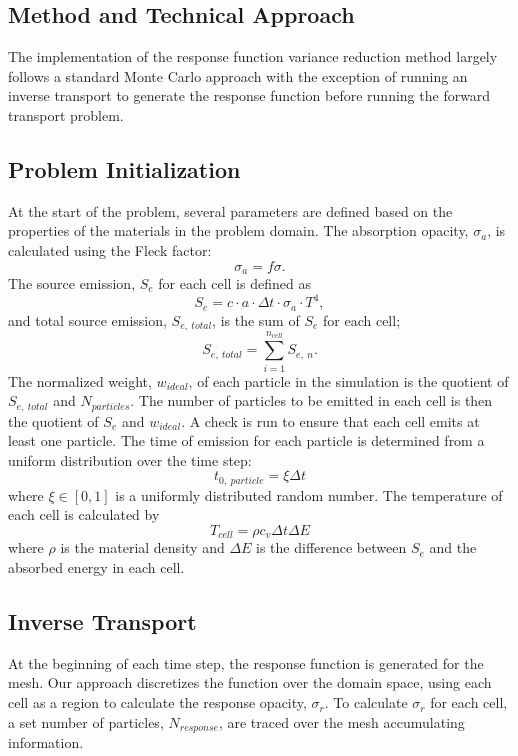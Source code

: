 \begin{chapabstract}
\section{Method and Technical Approach}
The implementation of the response function variance reduction method largely follows a standard Monte Carlo approach with the exception of running an inverse transport to generate the response function before running the forward transport problem. 

\subsection{Problem Initialization}	
At the start of the problem, several parameters are defined based on the properties of the materials in the problem domain. The absorption opacity, $\sigma_{a}$, is calculated using the Fleck factor:
\begin{equation}
\sigma_{a} = f \sigma.
\end{equation}The source emission, $S_{e}$ for each cell is defined as
\begin{equation}
S_{e} = c \cdot a \cdot \Delta t \cdot \sigma_{a}  \cdot T^{4},
\end{equation}
and total source emission, $S_{e,~total}$, is the sum of $S_{e}$ for each cell;
\begin{equation}
S_{e,~total} = \sum_{i = 1}^{n_{cell}} S_{e,~n}.
\end{equation}
The normalized weight, $w_{ideal}$, of each particle in the simulation is the quotient of $S_{e,~total}$ and $N_{particles}$. The number of particles to be emitted in each cell is then the quotient of $S_{e}$ and $w_{ideal}$. A check is run to ensure that each cell emits at least one particle. The time of emission for each particle is determined from a uniform distribution over the time step:
\begin{equation}
t_{0,~particle} = \xi \Delta t
\end{equation}
where $\xi \in [0,1]$ is a uniformly distributed random number. The temperature of each cell is calculated by
\begin{equation} \label{Eq: cell_T}
T_{cell} = \rho c_{v} \Delta t \Delta E
\end{equation}
where $\rho$ is the material density and $\Delta E$ is the difference between $S_{e}$ and the absorbed energy in each cell.

\subsection{Inverse Transport}
At the beginning of each time step, the response function is generated for the mesh. Our approach discretizes the function over the domain space, using each cell as a region to calculate the response opacity, $\sigma_{r}$. To calculate $\sigma_{r}$ for each cell, a set number of particles, $N_{response}$, are traced over the mesh accumulating information. 


\end{chapabstract}

